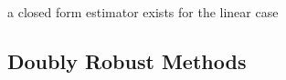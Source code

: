 \documentclass[8pt,twoside]{extarticle}
\begin{document}
\begin{multicols}{2}
{\begin{minipage}{28em}
a closed form estimator exists for the linear case

\end{minipage}}

























\end{multicols}



\subsection{Doubly Robust Methods}
\end{document}
